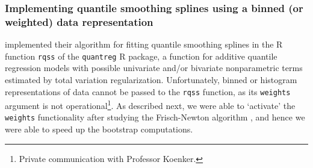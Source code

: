 \documentclass{statsoc}
\begin{document}
\subsubsection{Implementing quantile smoothing splines using a binned (or weighted) data representation}\label{weights}
 
\citet{koenker2007quantreg} implemented their algorithm for fitting quantile smoothing splines in the R function {\tt rqss} of the {\tt quantreg} R package, a function for additive quantile regression models with possible univariate and/or bivariate nonparametric terms estimated by total variation regularization. Unfortunately, binned or histogram representations of data cannot be passed to the {\tt rqss} function, as its {\tt weights} argument is not   {operational}\footnote{Private communication with Professor Koenker.}.
As described next, we were able to `activate' the {\tt weights} functionality after studying the Frisch-Newton algorithm \citep{koenker2005frisch}, and hence we were able to speed up the bootstrap computations. 
\end{document}
